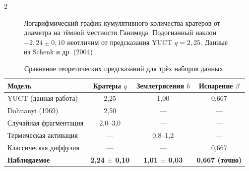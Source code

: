 \documentclass[11pt,a4paper]{article}
\begin{document}
\begin{multicols}{2}
		\begin{figure}[htbp]
			\centering
			\caption{Логарифмический график кумулятивного количества кратеров от диаметра на тёмной местности Ганимеда. Подогнанный наклон \(-2,24 \pm 0,10\) неотличим от предсказания YUCT \(q = 2,25\). Данные из Schenk и др. (2004) \cite{Schenk2004}.}
			\label{fig:craters}
		\end{figure}
		
		\begin{table}[htbp]
			\centering
			\caption{Сравнение теоретических предсказаний для трёх наборов данных.}
			\label{tab:comparison}
			\begin{tabular}{lccc}
				\toprule
				\textbf{Модель} & \textbf{Кратеры $q$} & \textbf{Землетрясения $b$} & \textbf{Испарение $\beta$} \\
				\midrule
				YUCT (данная работа) & 2,25 & 1,00 & 0,667 \\
				Dohnanyi (1969) \cite{Dohnanyi1969} & 2,50 & — & — \\
				Случайная фрагментация & 2,0–3,0 & — & — \\
				Термическая активация & — & 0,8–1,2 & — \\
				Классическая диффузия & — & — & 0,667 \\
				\textbf{Наблюдаемое} & \textbf{2,24 $\pm$ 0,10} & \textbf{1,01 $\pm$ 0,03} & \textbf{0,667 (точно)} \\
				\bottomrule
			\end{tabular}
		\end{table}
		

\end{multicols}
\end{document}
